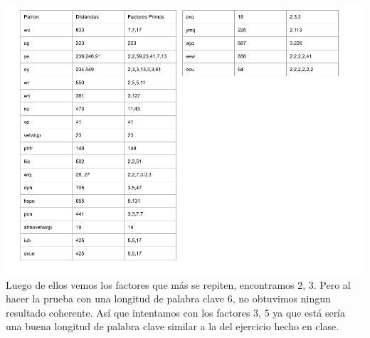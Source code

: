 \documentclass[12pt, letterpaper]{article}
\begin{document}
\includegraphics[width=\textwidth]{vigenere}\\

Luego de ellos vemos los factores que más se repiten, encontramos 2, 3. Pero al hacer la prueba con una longitud de palabra clave 6, no obtuvimos ningun resultado coherente.
Así que intentamos con los factores 3, 5 ya que está sería una buena longitud de palabra clave similar a la del ejercicio hecho en clase.\\
\end{document}

